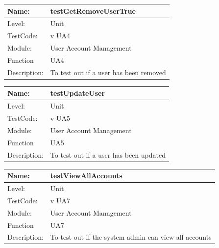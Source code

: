 \documentclass[12pt]{article}
\begin{document}
\begin{center}
\begin{tabular}{|l|p{12cm}|}
\hline

 Name: & testGetRemoveUserTrue \\
\hline
Level: & Unit \\
\hline
TestCode: & v UA4 \\
\hline
Module:& User Account Management\\
\hline
Function & UA4 \\
\hline
Description: & To test out if a user has been removed \\
\hline

\end{tabular}
\end{center}

\begin{center}
\begin{tabular}{|l|p{12cm}|}
\hline

 Name: & testUpdateUser \\
\hline
Level: & Unit \\
\hline
TestCode: & v UA5 \\
\hline
Module:& User Account Management\\
\hline
Function & UA5 \\
\hline
Description: & To test out if a user has been updated \\
\hline

\end{tabular}
\end{center}

\begin{center}
\begin{tabular}{|l|p{12cm}|}
\hline

 Name: & testViewAllAccounts \\
\hline
Level: & Unit \\
\hline
TestCode: & v UA7 \\
\hline
Module:& User Account Management\\
\hline
Function & UA7 \\
\hline
Description: & To test out if the system admin can view all accounts \\
\hline

\end{tabular}
\end{center}
\end{document}

